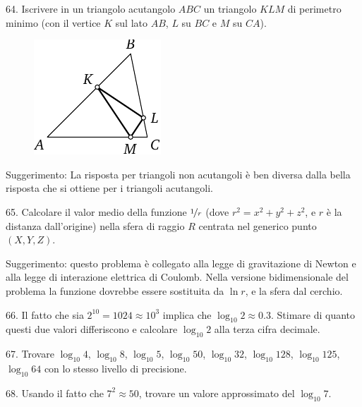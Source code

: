\begin{problem}{64.}
	 Iscrivere in un triangolo acutangolo $ABC$ un triangolo $KLM$ di perimetro minimo
	(con il vertice $K$ sul lato $AB$, $L$ su $BC$ e $M$ su $CA$).
	\begin{figure}
		\includegraphics{resources/taskbook-48}
	\end{figure}

	\begin{note}{Suggerimento:}
		La risposta per triangoli non acutangoli è ben diversa dalla bella risposta che si ottiene per i triangoli acutangoli.
	\end{note}
\end{problem}

\begin{problem}{65.}
	Calcolare il valor medio della funzione $\nicefrac{1}{r}$ (dove
	$r^2=x^2+y^2+z^2$, e $r$ è la distanza dall’origine) nella sfera di raggio
	$R$ centrata nel generico punto $(X,Y,Z)$.

	\begin{note}{Suggerimento:}
 questo problema è collegato alla legge di gravitazione di Newton e alla legge di interazione elettrica di Coulomb. Nella versione bidimensionale del problema la funzione dovrebbe essere sostituita da $\ln r$, e la sfera dal cerchio.
	\end{note}
\end{problem}

\begin{problem}{66.}
	Il fatto che sia $2^{10}=1024 \approx 10^3$ implica che
	$\log_{10} 2 \approx 0.3$. Stimare di quanto questi due valori differiscono e calcolare $\log_{10} 2$  alla terza cifra decimale.
\end{problem}

\begin{problem}{67.}
	Trovare $\log_{10} 4$, $\log_{10} 8$,
	$\log_{10} 5$, $\log_{10} 50$, $\log_{10} 32$, $\log_{10} 128$,
	$\log_{10} 125$, $\log_{10} 64$ con lo stesso livello di precisione.
\end{problem}

\begin{problem}{68.}
	Usando il fatto che $7^2 \approx 50$, trovare un valore approssimato del $\log_{10} 7$.
\end{problem}

